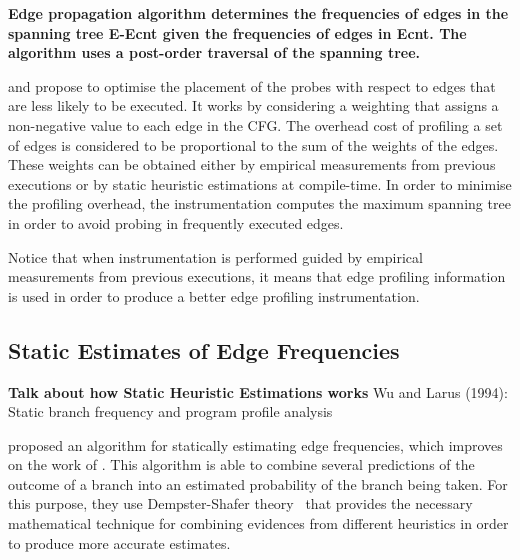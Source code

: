 \textbf{Edge propagation algorithm determines the frequencies of edges in the spanning tree E-Ecnt given the frequencies
of edges in Ecnt. The algorithm uses a post-order traversal of the spanning tree.}

\cite{forman81} and \cite{ball94} propose to optimise the placement of the probes with respect to edges that are less likely to be executed.
It works by considering a weighting that assigns a non-negative value to each edge in the CFG.
The overhead cost of profiling a set of edges is considered to be proportional to the sum of the weights of the edges.
These weights can be obtained either by empirical measurements from previous executions or by static heuristic estimations at compile-time.
In order to minimise the profiling overhead, the instrumentation computes the maximum spanning tree in order to avoid probing in frequently executed edges.

Notice that when instrumentation is performed guided by empirical measurements from previous executions, it means that edge profiling information is used in order to produce a better edge profiling instrumentation.


\subsection{Static Estimates of Edge Frequencies}

\textbf{Talk about how Static Heuristic Estimations works}
\citep{forman81,ball94}
Wu and Larus (1994): Static branch frequency and program profile analysis


\cite{wu94} proposed an algorithm for statically estimating edge frequencies, which improves on the work of \cite{wagner94}.
This algorithm is able to combine several predictions of the outcome of a branch into an estimated probability of the branch being taken.
For this purpose, they use Dempster-Shafer theory~\citep{shafer76} that provides the necessary mathematical technique for combining evidences from different heuristics in order to produce more accurate estimates.



